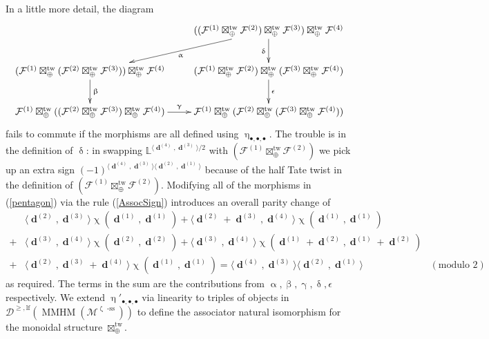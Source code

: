 \documentclass[a4paper,10pt]{amsart}
\renewcommand{\alpha}{\upalpha}
\renewcommand{\beta}{\upbeta}
\renewcommand{\gamma}{\upgamma}
\renewcommand{\delta}{\updelta}
\renewcommand{\zeta}{\upzeta}
\renewcommand{\chi}{\upchi}
\renewcommand{\eta}{\upeta}
\newcommand{\LL}{\mathbb{L}}
\newcommand{\Msp}{\mathcal{M}}
\DeclareMathOperator{\sst}{-ss}
\DeclareMathOperator{\tw}{tw}
\DeclareMathOperator{\MMHM}{MMHM}
\DeclareMathOperator{\dd}{\mathbf{d}}
\newcommand{\Dulf}{\mathcal{D}^{\geq, \mathrm{lf}}}
\begin{document}
In a little more detail, the diagram
\begin{align}
\label{pentagon}
\xymatrix{
& ((\mathcal{F}^{(1)}\boxtimes_{\oplus}^{\tw} \mathcal{F}^{(2)}) \boxtimes_{\oplus}^{\tw}\mathcal{F}^{(3)}) \boxtimes_{\oplus}^{\tw}\mathcal{F}^{(4)}\ar[dl]^{\alpha}\ar[d]_{\delta}\\
(\mathcal{F}^{(1)} \boxtimes_{\oplus}^{\tw}(\mathcal{F}^{(2)} \boxtimes_{\oplus}^{\tw}\mathcal{F}^{(3)})) \boxtimes_{\oplus}^{\tw}\mathcal{F}^{(4)}\ar[d]^{\beta}&(\mathcal{F}^{(1)}\boxtimes_{\oplus}^{\tw} \mathcal{F}^{(2)}) \boxtimes_{\oplus}^{\tw}(\mathcal{F}^{(3)}\boxtimes_{\oplus}^{\tw} \mathcal{F}^{(4)})\ar[d]^{\epsilon}\\
\mathcal{F}^{(1)}\boxtimes_{\oplus}^{\tw} ((\mathcal{F}^{(2)}\boxtimes_{\oplus}^{\tw} \mathcal{F}^{(3)})\boxtimes_{\oplus}^{\tw} \mathcal{F}^{(4)})\ar[r]^{\gamma}&\mathcal{F}^{(1)} \boxtimes_{\oplus}^{\tw}(\mathcal{F}^{(2)}\boxtimes_{\oplus}^{\tw} (\mathcal{F}^{(3)}\boxtimes_{\oplus}^{\tw} \mathcal{F}^{(4)}))
}
\end{align}
fails to commute if the morphisms are all defined using $\eta_{\bullet,\bullet,\bullet}$.  The trouble is in the definition of $\delta$: in swapping $\LL^{\langle \dd^{(4)},\dd^{(3)}\rangle/2}$ with $(\mathcal{F}^{(1)}\boxtimes_{\oplus}^{\tw} \mathcal{F}^{(2)})$ we pick up an extra sign $(-1)^{\langle \dd^{(4)},\dd^{(3)}\rangle\langle \dd^{(2)},\dd^{(1)}\rangle}$ because of the half Tate twist in the definition of $(\mathcal{F}^{(1)}\boxtimes_{\oplus}^{\tw} \mathcal{F}^{(2)})$.  Modifying all of the morphisms in (\ref{pentagon}) via the rule (\ref{AssocSign}) introduces an overall parity change of
\begin{align*}
&\langle \dd^{(2)},\dd^{(3)}\rangle\chi(\dd^{(1)},\dd^{(1)})+\langle \dd^{(2)}+\dd^{(3)},\dd^{(4)}\rangle\chi(\dd^{(1)},\dd^{(1)})
\\
+&\langle \dd^{(3)},\dd^{(4)}\rangle\chi(\dd^{(2)},\dd^{(2)})+\langle \dd^{(3)},\dd^{(4)}\rangle\chi(\dd^{(1)}+\dd^{(2)},\dd^{(1)}+\dd^{(2)})\\
+&\langle \dd^{(2)},\dd^{(3)}+\dd^{(4)}\rangle\chi(\dd^{(1)},\dd^{(1)})=\langle \dd^{(4)},\dd^{(3)}\rangle \langle \dd^{(2)},\dd^{(1)}\rangle &(\textrm{modulo }2)
\end{align*}
as required.  The terms in the sum are the contributions from $\alpha,\beta,\gamma,\delta,\epsilon$ respectively.  We extend $\eta'_{\bullet,\bullet,\bullet}$ via linearity to triples of objects in $\Dulf(\MMHM(\Msp^{\zeta\sst}))$ to define the associator natural isomorphism for the monoidal structure $\boxtimes_{\oplus}^{\tw}$.
\end{document}
